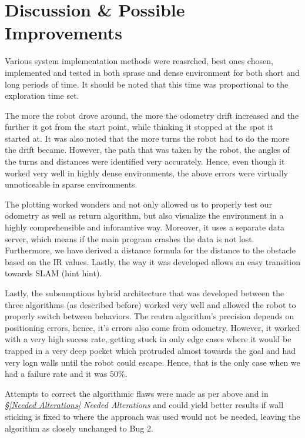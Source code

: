 \documentclass[11pt, a4paper]{article}
\begin{document}

\newpage
\section{Discussion \& Possible Improvements}

\label{Discussion}


Various system implementation methods were reasrched, best ones chosen, implemented and 
tested in both sprase and dense environment for both short and long periods of time. It
should be noted that this time was proportional to the exploration time set.

The more the robot drove around, the more the odometry drift increased and the further it got from the 
start point, while thinking it stopped at the spot it started at. It was also noted that the more 
turns the robot had to do the more the drift became. However, the path that was taken by the robot,
the angles of the turns and distances were identified very accurately. Hence, even though it worked very 
well in highly dense environments, the above errors were virtually unnoticeable in sparse environments.

The plotting worked wonders and not only allowed us to properly test our odometry as well as return algorithm,
but also visualize the environment in a highly comprehensible and inforamtive way. Moreover, it uses a separate
data server, which means if the main program crashes the data is not lost. Furthermore, we have derived a 
distance formula for the distance to the obstacle based on the IR values. Lastly, the way it was developed 
allows an easy transition towards SLAM (hint hint). %

Lastly, the subsumptious hybrid architecture that was developed between the three algorithms (as described
before) worked very well and allowed the robot to properly switch between behaviors. The reutrn algorithm's precision
depends on positioning errors, hence, it's errors also come from odometry. However, it worked with a
very high sucess rate, getting stuck in only edge cases where it would be trapped in a very deep pocket which
protruded almost towards the goal and had very logn walls until the robot could escape. Hence, that is the only case
when we had a failure rate and it was $50\%$. %

Attempts to correct the algorithmic flaws were made as per above and in \textit{\S\ref{Needed Alterations} Needed Alterations}
and could yield better results if wall sticking is fixed to where the approach was used
would not be needed, leaving the algorithm as closely unchanged to Bug 2.
\end{document}
